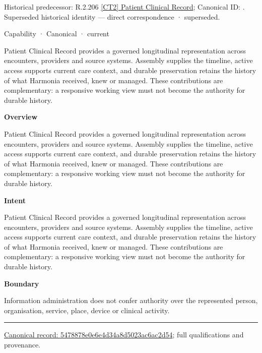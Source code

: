 {\small Historical predecessor: R.2.206 \hyperref[element:2e4de521bda24ad7b0ea64ae535b7f84]{[CT2] Patient Clinical Record}; Canonical ID: \texttt{}. Superseded historical identity — direct correspondence · superseded.}\par
\label{element:5478878e0e6e4d34a8d5023ac6ac2d54}
{\small Capability · Canonical · current}\par

Patient Clinical Record provides a governed longitudinal representation across encounters, providers and source systems. Assembly supplies the timeline, active access supports current care context, and durable preservation retains the history of what Harmonia received, knew or managed. These contributions are complementary: a responsive working view must not become the authority for durable history.



\textbf{Overview}



Patient Clinical Record provides a governed longitudinal representation across encounters, providers and source systems. Assembly supplies the timeline, active access supports current care context, and durable preservation retains the history of what Harmonia received, knew or managed. These contributions are complementary: a responsive working view must not become the authority for durable history.



\textbf{Intent}



Patient Clinical Record provides a governed longitudinal representation across encounters, providers and source systems. Assembly supplies the timeline, active access supports current care context, and durable preservation retains the history of what Harmonia received, knew or managed. These contributions are complementary: a responsive working view must not become the authority for durable history.



\textbf{Boundary}



Information administration does not confer authority over the represented person, organisation, service, place, device or clinical activity.



\medskip\hrule\medskip

{\footnotesize \href{../../../../continuum/strategy/capability/5478878e0e6e4d34a8d5023ac6ac2d54.md}{Canonical record: 5478878e0e6e4d34a8d5023ac6ac2d54}; full qualifications and provenance.}\par
